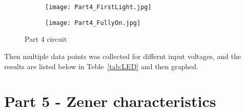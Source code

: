 \documentclass{article}
\begin{document}
\vspace{2em}


\begin{figure}[h]
    \centering
    \begin{subfigure}[t]{0.49\textwidth}
        \centering
        \texttt{[image: Part4\_FirstLight.jpg]}
        \label{fig:FirstLight}
    \end{subfigure}
    \hfill
    \begin{subfigure}[t]{0.49\textwidth}
        \centering
        \texttt{[image: Part4\_FullyOn.jpg]}
        \label{fig:Bright}
    \end{subfigure}
    \caption{Part 4 circuit}
    \label{fig:Part4States}
\end{figure}

Then multiple data points was collected for differnt input voltages, and the results are listed below in Teble~\ref{tab:LED} and then graphed.


\begin{table}[htbp]
  \centering
  \caption{LED values}
  \label{tab:LED}%
\end{table}



\section{Part 5 - Zener characteristics}

\end{document}
